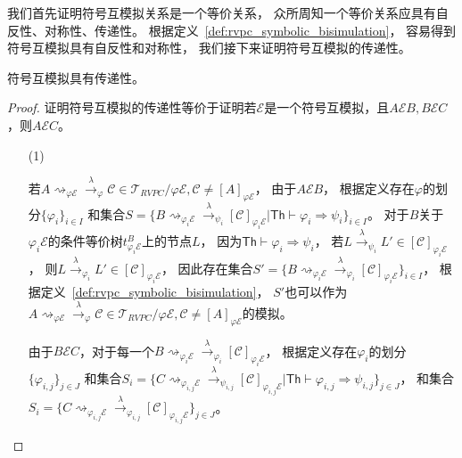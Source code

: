 我们首先证明符号互模拟关系是一个等价关系，
众所周知一个等价关系应具有自反性、对称性、传递性。
根据定义~\ref{def:rvpc_symbolic_bisimulation}，
容易得到符号互模拟具有自反性和对称性，
我们接下来证明符号互模拟的传递性。
\begin{lemma}\label{lemma:transitivity}
   符号互模拟具有传递性。
\end{lemma} 
\begin{proof}
   证明符号互模拟的传递性等价于证明若$\mathcal{E}$是一个符号互模拟，且$A\mathcal{E}B, B \mathcal{E} C$，则$A \mathcal{E} C$。
   \begin{itemize}
      \item[(1)] {
         若$A\rightsquigarrow_{\varphi \mathcal{E}}\stackrel{\lambda}{\rightarrow}_{\varphi} \mathcal{C}\in \mathcal{T}_{RVPC}/\varphi\mathcal{E},\mathcal{C}\neq [A]_{\varphi\mathcal{E}}$，
         由于$A\mathcal{E}B$，
         根据定义存在$\varphi$的划分$\{\varphi_i\}_{i\in I}$
         和集合$S=\{B\rightsquigarrow_{\varphi_i\mathcal{E}}\stackrel{\lambda}{\rightarrow}_{\psi_i}[\mathcal{C}]_{\varphi_i\mathcal{E}}|\mathsf{Th}\vdash \varphi_i\Rightarrow\psi_i\}_{i\in I}$。
         对于$B$关于$\varphi_i\mathcal{E}$的条件等价树$t^B_{\varphi_i\mathcal{E}}$上的节点$L$，
         因为$\mathsf{Th}\vdash\varphi_i\Rightarrow \psi_i$，
         若$L\stackrel{\lambda}{\rightarrow}_{\psi_i}L'\in [\mathcal{C}]_{\varphi_i\mathcal{E}}$，
         则$L\stackrel{\lambda}{\rightarrow}_{\varphi_i}L'\in [\mathcal{C}]_{\varphi_i\mathcal{E}}$，
         因此存在集合$S'=\{B\rightsquigarrow_{\varphi_i\mathcal{E}}\stackrel{\lambda}{\rightarrow}_{\varphi_i}[\mathcal{C}]_{\varphi_i\mathcal{E}}\}_{i\in I}$，
         根据定义~\ref{def:rvpc_symbolic_bisimulation}，
         $S'$也可以作为$A\rightsquigarrow_{\varphi \mathcal{E}}\stackrel{\lambda}{\rightarrow}_{\varphi} \mathcal{C}\in \mathcal{T}_{RVPC}/\varphi\mathcal{E},\mathcal{C}\neq [A]_{\varphi\mathcal{E}}$的模拟。
      
         由于$B\mathcal{E}C$，对于每一个$B\rightsquigarrow_{\varphi_i\mathcal{E}}\stackrel{\lambda}{\rightarrow}_{\varphi_i}[\mathcal{C}]_{\varphi_i\mathcal{E}}$，
         根据定义存在$\varphi_i$的划分$\{\varphi_{i,j}\}_{j\in J}$
         和集合$S_i=\{C\rightsquigarrow_{\varphi_{i,j}\mathcal{E}}\stackrel{\lambda}{\rightarrow}_{\psi_{i,j}}[\mathcal{C}]_{\varphi_{i,j}\mathcal{E}}|\mathsf{Th}\vdash \varphi_{i,j}\Rightarrow \psi_{i,j}\}_{j\in J}$，
         和集合$S_i=\{C\rightsquigarrow_{\varphi_{i,j}\mathcal{E}}\stackrel{\lambda}{\rightarrow}_{\varphi_{i,j}}[\mathcal{C}]_{\varphi_{i,j}\mathcal{E}}\}_{j\in J}$。

}
\end{itemize}
\end{proof}
